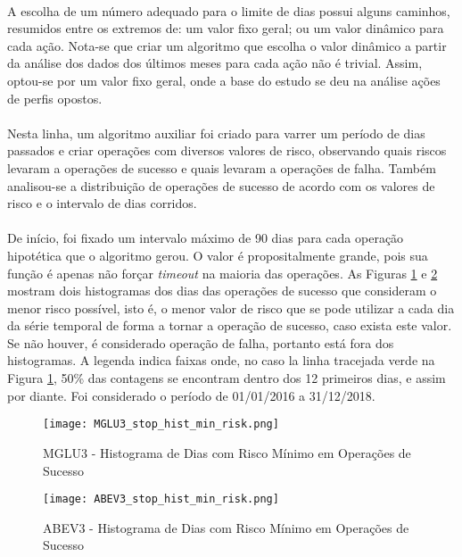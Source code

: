 \paragraph{} A escolha de um número adequado para o limite de dias possui alguns caminhos, resumidos entre os extremos de: um valor fixo geral; ou um valor dinâmico para cada ação. Nota-se que criar um algoritmo que escolha o valor dinâmico a partir da análise dos dados dos últimos meses para cada ação não é trivial. Assim, optou-se por um valor fixo geral, onde a base do estudo se deu na análise ações de perfis opostos.

\paragraph{} Nesta linha, um algoritmo auxiliar foi criado para varrer um período de dias passados e criar operações com diversos valores de risco, observando quais riscos levaram a operações de sucesso e quais levaram a operações de falha. Também analisou-se a distribuição de operações de sucesso de acordo com os valores de risco e o intervalo de dias corridos.

\paragraph{} De início, foi fixado um intervalo máximo de 90 dias para cada operação hipotética que o algoritmo gerou. O valor é propositalmente grande, pois sua função é apenas não forçar \textit{timeout} na maioria das operações. As Figuras \ref{fig:120} e \ref{fig:121} mostram dois histogramas dos dias das operações de sucesso que consideram o menor risco possível, isto é, o menor valor de risco que se pode utilizar a cada dia da série temporal de forma a tornar a operação de sucesso, caso exista este valor. Se não houver, é considerado operação de falha, portanto está fora dos histogramas. A legenda indica faixas onde, no caso la linha tracejada verde na Figura \ref{fig:120}, 50\% das contagens se encontram dentro dos 12 primeiros dias, e assim por diante. Foi considerado o período de 01/01/2016 a 31/12/2018.

\begin{figure}[h]
    \texttt{[image: MGLU3\_stop\_hist\_min\_risk.png]}
    \centering
    \caption{MGLU3 - Histograma de Dias com Risco Mínimo em Operações de Sucesso}
    \label{fig:120}
\end{figure}

\begin{figure}[h]
    \texttt{[image: ABEV3\_stop\_hist\_min\_risk.png]}
    \centering
    \caption{ABEV3 - Histograma de Dias com Risco Mínimo em Operações de Sucesso}
    \label{fig:121}
\end{figure}

